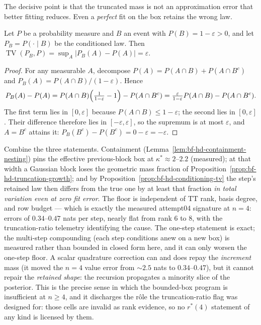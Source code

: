 The decisive point is that the truncated mass is not an approximation
error that better fitting reduces.  Even a \emph{perfect} fit on the box
retains the wrong law.

\begin{proposition}
\label{prop:bf-hd-conditioning-tv}
Let \(P\) be a probability measure and \(B\) an event with
\(P(B)=1-\varepsilon>0\), and let \(P_B=P(\cdot\mid B)\) be the
conditioned law.  Then
\(\operatorname{TV}(P_B,P)
 =\sup_{A}\lvert P_B(A)-P(A)\rvert=\varepsilon.\)
\end{proposition}

\begin{proof}
For any measurable \(A\), decompose \(P(A)=P(A\cap B)+P(A\cap B^{c})\)
and \(P_B(A)=P(A\cap B)/(1-\varepsilon)\).  Hence
\[
  P_B(A)-P(A)
  =P(A\cap B)\Bigl(\tfrac{1}{1-\varepsilon}-1\Bigr)-P(A\cap B^{c})
  =\tfrac{\varepsilon}{1-\varepsilon}P(A\cap B)-P(A\cap B^{c}).
\]
The first term lies in \([0,\varepsilon]\) because
\(P(A\cap B)\le 1-\varepsilon\); the second lies in
\([0,\varepsilon]\).  Their difference therefore lies in
\([-\varepsilon,\varepsilon]\), so the supremum is at most
\(\varepsilon\), and \(A=B^{c}\) attains it:
\(P_B(B^{c})-P(B^{c})=0-\varepsilon=-\varepsilon\).
\end{proof}

\begin{remark}
\label{rem:bf-hd-bias-floor}
Combine the three statements.  Containment
(Lemma~\ref{lem:bf-hd-containment-nesting}) pins the effective
previous-block box at \(\kappa^{*}\approx2\)--\(2.2\) (measured);
at that width a Gaussian block loses the geometric mass fraction of
Proposition~\ref{prop:bf-hd-truncation-growth}; and by
Proposition~\ref{prop:bf-hd-conditioning-tv} the step's retained law then
differs from the true one by at least that fraction \emph{in total
variation even at zero fit error}.  The floor is independent of TT rank,
basis degree, and row budget --- which is exactly the measured attempt04
signature at \(n=4\): errors of \(0.34\)--\(0.47\) nats per step, nearly
flat from rank \(6\) to \(8\), with the truncation-ratio telemetry
identifying the cause.  The one-step statement is exact; the multi-step
compounding (each step conditions anew on a new box) is measured rather
than bounded in closed form here, and it can only worsen the one-step
floor.  A scalar quadrature correction can and does repay the
\emph{increment} mass (it moved the \(n=4\) value error from
\({\sim}2.5\) nats to \(0.34\)--\(0.47\)), but it cannot repair the
\emph{retained shape}: the recursion propagates a minority slice of the
posterior.  This is the precise sense in which the bounded-box program is
insufficient at \(n\ge4\), and it discharges the r\^ole the
truncation-ratio flag was designed for: those cells are invalid as rank
evidence, so no \(r^{*}(4)\) statement of any kind is licensed by them.
\end{remark}

